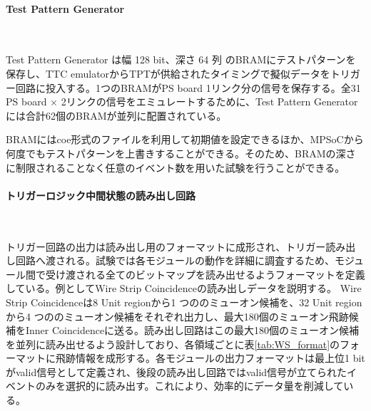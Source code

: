 \paragraph{Test Pattern Generator}　　
\par
Test Pattern Generator は幅 128 bit、深さ 64 列 のBRAMにテストパターンを保存し、TTC emulatorからTPTが供給されたタイミングで擬似データをトリガー回路に投入する。1つのBRAMがPS board 1リンク分の信号を保存する。全31 PS board $\times$ 2リンクの信号をエミュレートするために、Test Pattern Generatorには合計62個のBRAMが並列に配置されている。

BRAMにはcoe形式のファイルを利用して初期値を設定できるほか、MPSoCから何度でもテストパターンを上書きすることができる。そのため、BRAMの深さに制限されることなく任意のイベント数を用いた試験を行うことができる。


\paragraph{トリガーロジック中間状態の読み出し回路}　　
\par
トリガー回路の出力は読み出し用のフォーマットに成形され、トリガー読み出し回路へ渡される。試験では各モジュールの動作を詳細に調査するため、モジュール間で受け渡される全てのビットマップを読み出せるようフォーマットを定義している。例としてWire Strip Coincidenceの読み出しデータを説明する。
Wire Strip Coincidenceは8 Unit regionから1 つののミューオン候補を、32 Unit regionから4 つののミューオン候補をそれぞれ出力し、最大180個のミューオン飛跡候補をInner Coincidenceに送る。読み出し回路はこの最大180個のミューオン候補を並列に読み出せるよう設計しており、各領域ごとに表\ref{tab:WS_format}のフォーマットに飛跡情報を成形する。各モジュールの出力フォーマットは最上位1 bitがvalid信号として定義され、後段の読み出し回路ではvalid信号が立てられたイベントのみを選択的に読み出す。これにより、効率的にデータ量を削減している。

